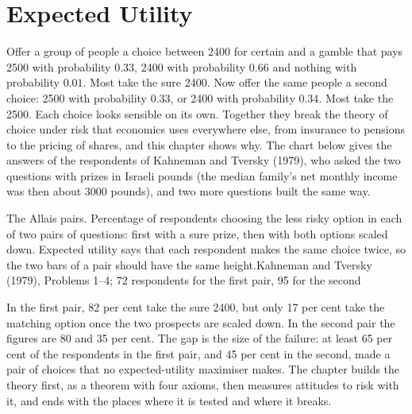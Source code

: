 \chapter{Expected Utility}\label{ch:b2:expected-utility}

Offer a group of people a choice between \num{2400} for certain and a gamble that pays \num{2500} with
probability $0.33$, \num{2400} with probability $0.66$ and nothing with probability $0.01$. Most take
the sure \num{2400}. Now offer the same people a second choice: \num{2500} with probability $0.33$, or
\num{2400} with probability $0.34$. Most take the \num{2500}. Each choice looks sensible on its own.
Together they break the theory of choice under risk that economics uses everywhere else, from
insurance to pensions to the pricing of shares, and this chapter shows why. The chart below gives
the answers of the respondents of Kahneman and Tversky (1979), who asked the two questions with
prizes in Israeli pounds (the median family's net monthly income was then about \num{3000} pounds),
and two more questions built the same way.

\begin{openingchart}{The Allais pairs. Percentage of respondents choosing the less risky option in each
  of two pairs of questions: first with a sure prize, then with both options scaled down. Expected
  utility says that each respondent makes the same choice twice, so the two bars of a pair should
  have the same height.}{Kahneman and Tversky (1979), Problems 1--4; 72 respondents for the first pair, 95 for the second}
\end{openingchart}

In the first pair, 82 per cent take the sure \num{2400}, but only 17 per cent take the matching
option once the two prospects are scaled down. In the second pair the figures are 80 and 35 per cent.
The gap is the size of the failure: at least 65 per cent of the respondents in the first pair, and
45 per cent in the second, made a pair of choices that no expected-utility maximiser makes. The
chapter builds the theory first, as a theorem with four axioms, then measures attitudes to risk with
it, and ends with the places where it is tested and where it breaks.

